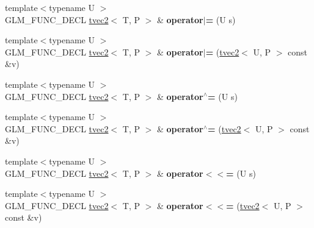 \begin{DoxyCompactItemize}
\item 
\hypertarget{structglm_1_1detail_1_1tvec2_a62015e8977847b4c13e0dd396802a5b0}{{\footnotesize template$<$typename U $>$ }\\G\-L\-M\-\_\-\-F\-U\-N\-C\-\_\-\-D\-E\-C\-L \hyperlink{structglm_1_1detail_1_1tvec2}{tvec2}$<$ T, P $>$ \& {\bfseries operator$\vert$=} (U s)}\label{structglm_1_1detail_1_1tvec2_a62015e8977847b4c13e0dd396802a5b0}

\item 
\hypertarget{structglm_1_1detail_1_1tvec2_aea5cce6a904468eb31c039643a18c9af}{{\footnotesize template$<$typename U $>$ }\\G\-L\-M\-\_\-\-F\-U\-N\-C\-\_\-\-D\-E\-C\-L \hyperlink{structglm_1_1detail_1_1tvec2}{tvec2}$<$ T, P $>$ \& {\bfseries operator$\vert$=} (\hyperlink{structglm_1_1detail_1_1tvec2}{tvec2}$<$ U, P $>$ const \&v)}\label{structglm_1_1detail_1_1tvec2_aea5cce6a904468eb31c039643a18c9af}

\item 
\hypertarget{structglm_1_1detail_1_1tvec2_a5275bd243c23d0898f39e094da95b2a1}{{\footnotesize template$<$typename U $>$ }\\G\-L\-M\-\_\-\-F\-U\-N\-C\-\_\-\-D\-E\-C\-L \hyperlink{structglm_1_1detail_1_1tvec2}{tvec2}$<$ T, P $>$ \& {\bfseries operator$^\wedge$=} (U s)}\label{structglm_1_1detail_1_1tvec2_a5275bd243c23d0898f39e094da95b2a1}

\item 
\hypertarget{structglm_1_1detail_1_1tvec2_ad24ddb39053aaf91cbb40610e813fcac}{{\footnotesize template$<$typename U $>$ }\\G\-L\-M\-\_\-\-F\-U\-N\-C\-\_\-\-D\-E\-C\-L \hyperlink{structglm_1_1detail_1_1tvec2}{tvec2}$<$ T, P $>$ \& {\bfseries operator$^\wedge$=} (\hyperlink{structglm_1_1detail_1_1tvec2}{tvec2}$<$ U, P $>$ const \&v)}\label{structglm_1_1detail_1_1tvec2_ad24ddb39053aaf91cbb40610e813fcac}

\item 
\hypertarget{structglm_1_1detail_1_1tvec2_a4c1990d9dd6b9a617a782c7272a3ba0b}{{\footnotesize template$<$typename U $>$ }\\G\-L\-M\-\_\-\-F\-U\-N\-C\-\_\-\-D\-E\-C\-L \hyperlink{structglm_1_1detail_1_1tvec2}{tvec2}$<$ T, P $>$ \& {\bfseries operator$<$$<$=} (U s)}\label{structglm_1_1detail_1_1tvec2_a4c1990d9dd6b9a617a782c7272a3ba0b}

\item 
\hypertarget{structglm_1_1detail_1_1tvec2_a0b22d5e95e2ecbd4024c04910db325ce}{{\footnotesize template$<$typename U $>$ }\\G\-L\-M\-\_\-\-F\-U\-N\-C\-\_\-\-D\-E\-C\-L \hyperlink{structglm_1_1detail_1_1tvec2}{tvec2}$<$ T, P $>$ \& {\bfseries operator$<$$<$=} (\hyperlink{structglm_1_1detail_1_1tvec2}{tvec2}$<$ U, P $>$ const \&v)}\label{structglm_1_1detail_1_1tvec2_a0b22d5e95e2ecbd4024c04910db325ce}


\end{DoxyCompactItemize}
